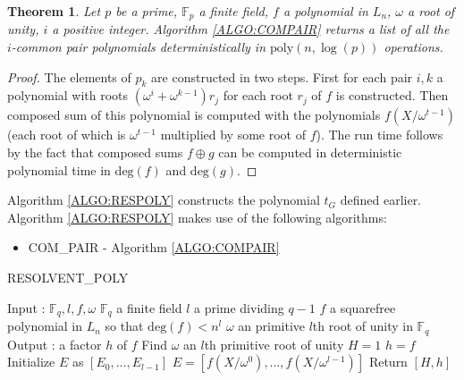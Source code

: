 \documentclass{article}
\newcounter{dummy} \numberwithin{dummy}{section}
\theoremstyle{plain}
\newtheorem{thm}[dummy]{Theorem}
\theoremstyle{definition}
\def\Fp {{ \mathbb{F} _ {p} }}
\def\Fq {{ \mathbb{F} _ {q} }}
\def\deg {{ \mathrm{deg}}}
\def\poly {{ \mathrm{poly} }}
\begin{document}
		\begin{thm}
		\label{THM:COMPAIR}
		    Let $p$ be a prime, $\Fp$ a finite field, $f$ a polynomial in $L_n$, $\omega$ a root of unity, $i$ a positive integer. Algorithm \ref{ALGO:COMPAIR} returns a list of all the $i$-common pair polynomials deterministically in $\poly(n,\log(p))$ operations.
		\end{thm}
		
		\begin{proof}
		    The elements of $p_k$ are constructed in two steps. First for each pair $i,k$ a polynomial with roots $({\omega}^{i}+{\omega}^{k-1})r_j$ for each root $r_j$ of $f$ is constructed. Then composed sum of this polynomial is computed with the polynomials $f(X/{\omega}^{t-1} )$ (each root of which is $\omega^{t-1}$ multiplied by some root of $f$). The run time follows by the fact that composed sums $f \oplus g$ can be computed in deterministic polynomial time in $\deg(f)$ and $\deg(g)$. 
		\end{proof}
			
		Algorithm \ref{ALGO:RESPOLY} constructs the polynomial $t_G$ defined earlier. Algorithm \ref{ALGO:RESPOLY} makes use of the following algorithms: 
		\begin{itemize}
    \item COM\_PAIR - Algorithm \ref{ALGO:COMPAIR} 
		\end{itemize}
		
		\begin{singlespace}
    \begin{algorithm}[H]
		\DontPrintSemicolon
    \label{ALGO:RESPOLY}	
    \caption{RESOLVENT\_POLY}
        Input : $\Fq,l,f,\omega$ \;
				\hspace{2mm} $\Fq$ a finite field \;
				\hspace{2mm} $l$ a prime dividing $q-1$ \;
				\hspace{2mm} $f$ a squarefree polynomial in $L_n$ so that $\deg(f) < n^l$ \;
				\hspace{2mm} $\omega$ an primitive $l$th root of unity in $\Fq$ \;
		    Output : a factor $h$ of $f$ \;
				\;
		    Find $\omega$ an $l$th primitive root of unity \;
        $H =1$ \;
        $h=f$ \;
		    Initialize $E$ as $[E_0,\ldots,E_{l-1}]$ \;
        $E=[f(X/ \omega^0),\ldots,f(X/ \omega^{l-1})]$ \;  
		    Return $[H,h]$ \;
    \end{algorithm}
    \end{singlespace} 
		\vspace{5mm}
			
\end{document}
